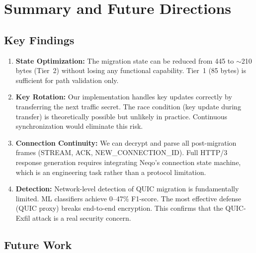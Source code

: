 \documentclass[11pt,a4paper]{article}
\begin{document}
\newpage
\section{Summary and Future Directions}

\subsection{Key Findings}

\begin{enumerate}
    \item \textbf{State Optimization:} The migration state can be reduced from 445 to $\sim$210 bytes (Tier~2) without losing any functional capability. Tier~1 (85 bytes) is sufficient for path validation only.

    \item \textbf{Key Rotation:} Our implementation handles key updates correctly by transferring the next traffic secret. The race condition (key update during transfer) is theoretically possible but unlikely in practice. Continuous synchronization would eliminate this risk.

    \item \textbf{Connection Continuity:} We can decrypt and parse all post-migration frames (STREAM, ACK, NEW\_CONNECTION\_ID). Full HTTP/3 response generation requires integrating Neqo's connection state machine, which is an engineering task rather than a protocol limitation.

    \item \textbf{Detection:} Network-level detection of QUIC migration is fundamentally limited. ML classifiers achieve 0--47\% F1-score. The most effective defense (QUIC proxy) breaks end-to-end encryption. This confirms that the QUIC-Exfil attack is a real security concern.
\end{enumerate}

\subsection{Future Work}
\end{document}
